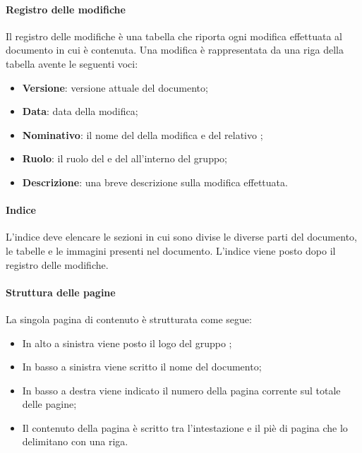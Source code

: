 \paragraph{Registro delle modifiche}
Il registro delle modifiche è una tabella che riporta ogni modifica effettuata al documento in cui è contenuta. Una modifica è rappresentata da una riga della tabella avente le seguenti voci:
\begin{itemize}

	\item \textbf{Versione}: versione attuale del documento;
	
	\item \textbf{Data}: data della modifica;
	
	\item \textbf{Nominativo}: il nome del  della modifica e del relativo ;
	
	\item \textbf{Ruolo}: il ruolo del  e del  all'interno del gruppo;

	\item \textbf{Descrizione}: una breve descrizione sulla modifica effettuata.
\end{itemize}

\paragraph{Indice}
L'indice deve elencare le sezioni in cui sono divise le diverse parti del documento, le tabelle e le immagini presenti nel documento. L'indice viene posto dopo il registro delle modifiche.

\paragraph{Struttura delle pagine}
La singola pagina di contenuto è strutturata come segue:
\begin{itemize}

	\item In alto a sinistra viene posto il logo del gruppo \Gruppo{};
	
	\item In basso a sinistra viene scritto il nome del documento;
	
	\item In basso a destra viene indicato il numero della pagina corrente sul totale delle pagine;
	
	\item Il contenuto della pagina è scritto tra l'intestazione e il piè di pagina che lo delimitano con una riga.
\end{itemize}

